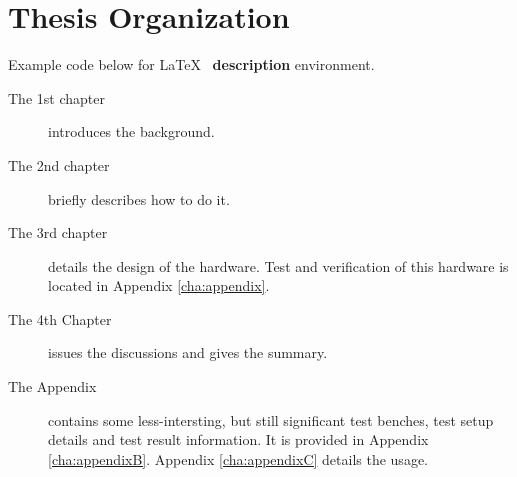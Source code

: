 \section{Thesis Organization}
Example code below for \LaTeX ~ \textbf{description} environment.
\begin{description}
\item[The 1st chapter] introduces the background. 

\item[The 2nd chapter] briefly describes how to do it.

\item[The 3rd chapter] details the design of the hardware. Test and verification of this hardware is located in Appendix \ref{cha:appendix}.

\item[The 4th Chapter] issues the discussions and gives the summary. 

\item [The Appendix] contains some less-intersting, but still significant test benches, test setup details and test result information.  It is provided in Appendix \ref{cha:appendixB}. Appendix \ref{cha:appendixC} details the usage.
\end{description}
